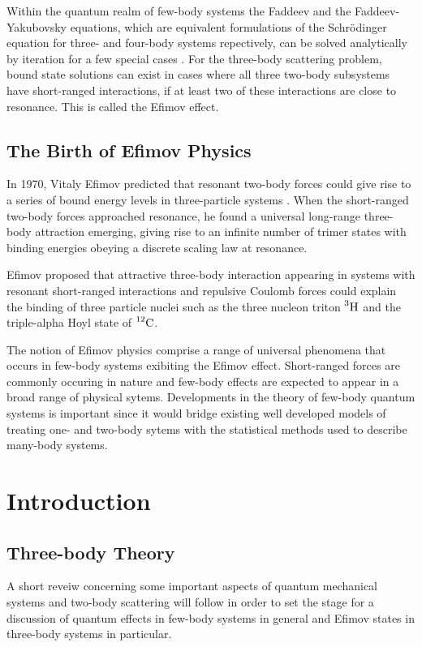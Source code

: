 \documentclass{article}
\begin{document}
Within the quantum realm of few-body systems the Faddeev and the Faddeev-Yakubovsky equations, which are equivalent formulations of the Schr{\"o}dinger equation for three- and four-body systems repectively, can be solved analytically by iteration for a few special cases \cite{Faddeev:1960su, Zubarev:1994}. For the three-body scattering problem, bound state solutions can exist in cases where all three two-body subsystems have short-ranged interactions, if at least two of these interactions are close to resonance. This is called the Efimov effect. 

\subsection{The Birth of Efimov Physics}
 In 1970, Vitaly Efimov predicted that resonant two-body forces could give rise to a series of bound energy levels in three-particle systems \cite{Efimov:1970zz}. When the short-ranged two-body forces approached resonance, he found a universal long-range three-body attraction emerging, giving rise to an infinite number of trimer states with binding energies obeying a discrete scaling law at resonance.  
 
 Efimov proposed that attractive three-body interaction appearing in systems with resonant short-ranged interactions and repulsive Coulomb forces could explain the binding of three particle nuclei such as the three nucleon triton $\prescript{3}{}{\mathrm{H}}$ and the triple-alpha Hoyl state of $\prescript{12}{}{\mathrm{C}}$.

The notion of Efimov physics comprise a range of universal phenomena that occurs in few-body systems exibiting the Efimov effect. Short-ranged forces are commonly occuring in nature and few-body effects are expected to appear in a broad range of physical sytems. Developments in the theory of few-body quantum systems is important since it would bridge existing well developed models of treating one- and two-body sytems with the statistical methods used to describe many-body systems.

\section{Introduction} 
\subsection{Three-body Theory}
A short reveiw concerning some important aspects of quantum mechanical systems and two-body scattering will follow in order to set the stage for a discussion of quantum effects in few-body systems in general and Efimov states in three-body systems in particular. 
\end{document}
